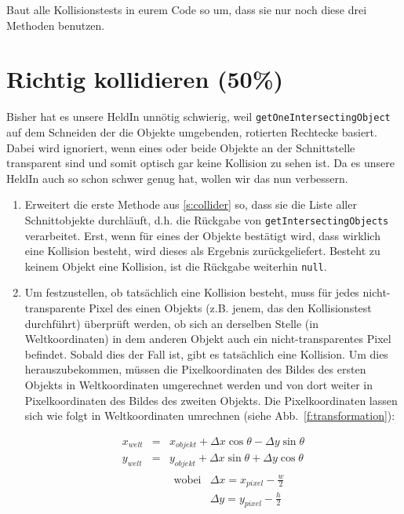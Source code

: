 \documentclass{../pi-aufgabenblatt}
\begin{document}
Baut alle Kollisionstests in eurem Code so um, dass sie nur noch diese drei Methoden benutzen.

\section{Richtig kollidieren (50\%)}

Bisher hat es unsere HeldIn unnötig schwierig, weil \texttt{getOneIntersectingObject} auf dem Schneiden der die Objekte umgebenden, rotierten Rechtecke basiert. Dabei wird ignoriert, wenn eines oder beide Objekte an der Schnittstelle transparent sind und somit optisch gar keine Kollision zu sehen ist. Da es unsere HeldIn auch so schon schwer genug hat, wollen wir das nun verbessern.

\begin{enumerate}

\item Erweitert die erste Methode aus \ref{s:collider} so, dass sie die Liste aller Schnittobjekte durchläuft, d.h. die Rückgabe von \texttt{getIntersectingObjects} verarbeitet. Erst, wenn für eines der Objekte bestätigt wird, dass wirklich eine Kollision besteht, wird dieses als Ergebnis zurückgeliefert. Besteht zu keinem Objekt eine Kollision, ist die Rückgabe weiterhin \texttt{null}.

\item Um festzustellen, ob tatsächlich eine Kollision besteht, muss für jedes nicht-transparente Pixel des einen Objekts (z.B. jenem, das den Kollisionstest durchführt) überprüft werden, ob sich an derselben Stelle (in Weltkoordinaten) in dem anderen Objekt auch ein nicht-transparentes Pixel befindet. Sobald dies der Fall ist, gibt es tatsächlich eine Kollision. Um dies herauszubekommen, müssen die Pixelkoordinaten des Bildes des ersten Objekts in Weltkoordinaten umgerechnet werden und von dort weiter in Pixelkoordinaten des Bildes des zweiten Objekts. Die Pixelkoordinaten lassen sich wie folgt in Weltkoordinaten umrechnen (siehe Abb.~\ref{f:transformation}):

$$
\begin{array}{rcl}
x_{welt} & \!\!\! = \!\!\! & x_{objekt} + \Delta x\cos\theta - \Delta y \sin\theta \\
y_{welt} & \!\!\! = \!\!\! & y_{objekt} + \Delta x\sin\theta + \Delta y \cos\theta \\
    && \!\!\! \begin{array}{ll}
        \mbox{wobei} & \Delta x = x_{pixel} - \frac w 2 \\
        & \Delta y = y_{pixel} - \frac h 2
    \end{array}
\end{array}
$$


\end{enumerate}
\end{document}
